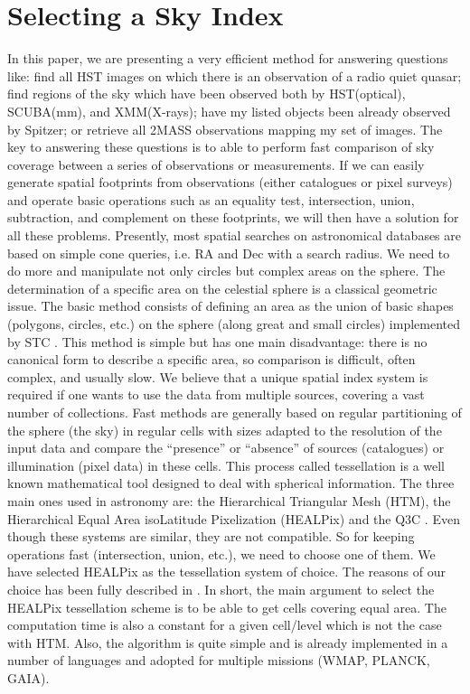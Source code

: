 \section{Selecting a Sky Index}
In this paper, we are presenting a very efficient method for answering questions like: find all HST images on which there is an observation of a radio quiet quasar; find regions of the sky which have been observed both by HST(optical), SCUBA(mm), and XMM(X-rays); have my listed objects been already observed by Spitzer; or retrieve all 2MASS observations mapping my set of images. The key to answering these questions is to able to perform fast comparison of sky coverage between a series of observations or measurements. If we can easily generate spatial footprints from observations (either catalogues or pixel surveys) and operate basic operations such as an equality test, intersection, union, subtraction, and complement on these footprints, we will then have a solution for all these problems. Presently, most spatial searches on astronomical databases are based on simple cone queries, i.e. RA and Dec with a search radius. We need to do more and manipulate not only circles but complex areas on the sphere. The determination of a specific area on the celestial sphere is a classical geometric issue. The basic method consists of defining an area as the union of basic shapes (polygons, circles, etc.) on the sphere (along great and small circles) implemented by STC \citep{STC}. This method is simple but has one main disadvantage: there is no canonical form to describe a specific area, so comparison is difficult, often complex, and usually slow. We believe that a unique spatial index system is required if one wants to use the data from multiple sources, covering a vast number of collections. Fast methods are generally based on regular partitioning of the sphere (the sky) in regular cells with sizes adapted to the resolution of the input data and compare the ``presence'' or ``absence'' of sources (catalogues) or illumination (pixel data) in these cells. This process called tessellation is a well known mathematical tool designed to deal with spherical information. The three main ones used in astronomy are: the Hierarchical Triangular Mesh \cite{HTM} (HTM), the Hierarchical Equal Area isoLatitude Pixelization \citep{Healpix} (HEALPix) and the Q3C \citep{quadtreee}. Even though these systems are similar, they are not compatible. So for keeping operations fast (intersection, union, etc.), we need to choose one of them. We have selected HEALPix as the tessellation system of choice. The reasons of our choice has been fully described in  \citep{Fernique}. In short, the main argument to select the HEALPix tessellation scheme is to be able to get cells covering equal area. The computation time is also a constant for a given cell/level which is not the case with HTM. Also, the algorithm is quite simple and is already implemented in a number of languages and adopted for multiple missions  (WMAP, PLANCK, GAIA).


